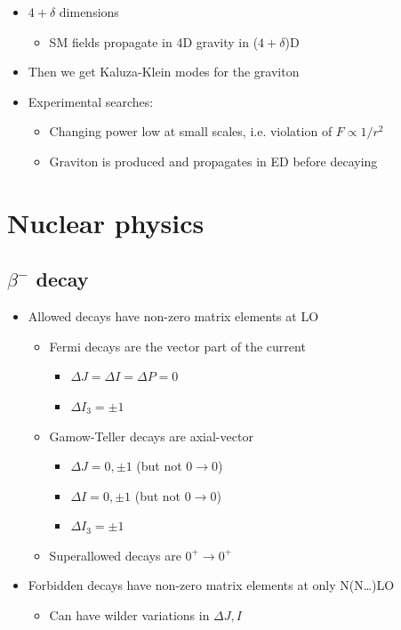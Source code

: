 \begin{itemize}
   \begin{itemize}
     \item $4+\delta$ dimensions
     \begin{itemize}
       \item SM fields propagate in 4D gravity in ($4+\delta$)D
     \end{itemize}
     \item Then we get Kaluza-Klein modes for the graviton
     \item Experimental searches:
     \begin{itemize}
       \item Changing power low at small scales, i.e. violation of $F \propto 1/r^2$
       \item Graviton is produced and propagates in ED before decaying\thus \met
     \end{itemize}
   \end{itemize}
\end{itemize}

\section{Nuclear physics}
\subsection{$\beta^-$ decay}
\begin{itemize}
  \item Allowed decays have non-zero matrix elements at LO
  \begin{itemize}
    \item Fermi decays are the vector part of the current
    \begin{itemize}
      \item $\Delta J = \Delta I = \Delta P = 0$
      \item $\Delta I_3 = \pm 1$
    \end{itemize}
    \item Gamow-Teller decays are axial-vector
    \begin{itemize}
      \item $\Delta J  = 0,\pm 1$ (but not $0\rightarrow 0$)
      \item $\Delta I  = 0,\pm 1$ (but not $0\rightarrow 0$)
      \item $\Delta I_3 = \pm 1$
    \end{itemize}
    \item Superallowed decays are $0^+\rightarrow 0^+$
  \end{itemize}
  \item Forbidden decays have non-zero matrix elements at only N(N\dots)LO
  \begin{itemize}
    \item Can have wilder variations in $\Delta J,I$
  \end{itemize}
\end{itemize}

